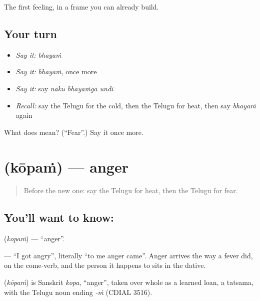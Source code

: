 \begin{grammarlens}[title={What you've built}]
The first feeling, in a frame you can already build.
\end{grammarlens}

\subsection*{Your turn}
\begin{itemize}
\raggedright
  \item \emph{Say it:} \emph{bhayaṁ}
  \item \emph{Say it:} \emph{bhayaṁ}, once more
  \item \emph{Say it:} say \emph{nāku bhayaṁgā undi}
  \item \emph{Recall:} say the Telugu for the cold, then the Telugu for heat, then say \emph{bhayaṁ} again
\end{itemize}

\begin{tcolorbox}[breakable,colback=teal!4,colframe=teal!35!black,title={Before you move on}]
What does  mean? (\textquotedblleft{}Fear\textquotedblright{}.) Say it once more.
\end{tcolorbox}
\section[\texorpdfstring{\te{కోపం} (kōpaṁ)}{కోపం (kōpaṁ)}]{ (kōpaṁ) — anger}

\label{lesson:TE-C85-anger}



\begin{quote}
Before the new one: say the Telugu for heat, then the Telugu for fear.
\end{quote}

\subsection*{You'll want to know: }
\textbf{} (\emph{kōpaṁ}) — \textquotedblleft{}anger\textquotedblright{}.

\textbf{  } — \textquotedblleft{}I got angry\textquotedblright{}, literally \textquotedblleft{}to me anger came\textquotedblright{}. Anger arrives the way a fever did, on the come-verb, and the person it happens to sits in the dative.

\begin{cousinweb}
\textbf{} (\emph{kōpaṁ}) is Sanskrit \emph{kopa}, \textquotedblleft{}anger\textquotedblright{}, taken over whole as a learned loan, a tatsama, with the Telugu noun ending \emph{-ṁ} (CDIAL 3516).
\end{cousinweb}

